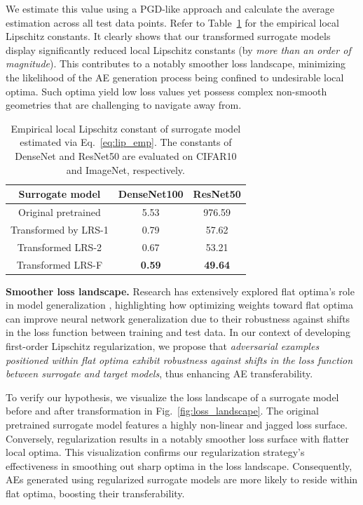 \documentclass[letterpaper]{article} %
\theoremstyle{plain}
\theoremstyle{definition}
\newcommand{\fref}[1]{Fig.~\ref{#1}}
\newcommand{\tref}[1]{Table~\ref{#1}}
\begin{document}
We estimate this value using a PGD-like approach and calculate the average estimation across all test data points. Refer to \tref{tab:lip_const} for the empirical local Lipschitz constants. It clearly shows that our transformed surrogate models display significantly reduced local Lipschitz constants (by {\em more than an order of magnitude}). This contributes to a notably smoother loss landscape, minimizing the likelihood of the AE generation process being confined to undesirable local optima. Such optima yield low loss values yet possess complex non-smooth geometries that are challenging to navigate away from.

\begin{table}[ht!]
\small
\begin{center}
\begin{tabular}{|c|c|c|}
\hline
Surrogate model & DenseNet100 & ResNet50\\
\hline
Original pretrained  & 5.53 &  976.59\\
Transformed by LRS-1 & 0.79 &  57.62\\
Transformed LRS-2 & 0.67 &  53.21\\
Transformed LRS-F & \textbf{0.59} & \textbf{49.64} \\
\hline
\end{tabular}
\caption{Empirical local Lipschitz constant of surrogate model estimated via Eq.~\eqref{eq:lip_emp}. The constants of DenseNet and ResNet50 are evaluated on CIFAR10 and ImageNet, respectively.}
\label{tab:lip_const}
\end{center}
\end{table}


\textbf{Smoother loss landscape.}
Research has extensively explored flat optima's role in model generalization \cite{chaudhari2019entropy,keskar2017on,foret2020sharpness}, highlighting how optimizing weights toward flat optima can improve neural network generalization due to their robustness against shifts in the loss function between training and test data. In our context of developing first-order Lipschitz regularization, we propose that \emph{adversarial examples positioned within flat optima exhibit robustness against shifts in the loss function between surrogate and target models}, thus enhancing AE transferability.

To verify our hypothesis, we visualize the loss landscape of a surrogate model before and after transformation in \fref{fig:loss_landscape}. The original pretrained surrogate model features a highly non-linear and jagged loss surface. Conversely, regularization results in a notably smoother loss surface with flatter local optima. This visualization confirms our regularization strategy's effectiveness in smoothing out sharp optima in the loss landscape. Consequently, AEs generated using regularized surrogate models are more likely to reside within flat optima, boosting their transferability.
\end{document}
